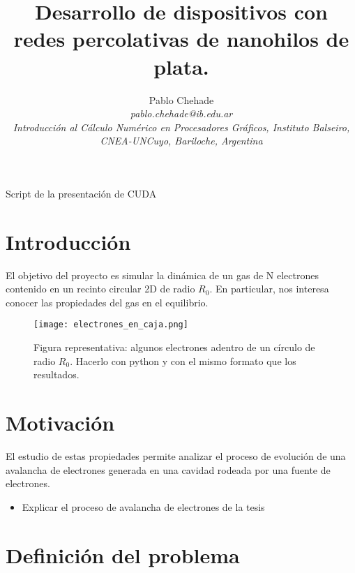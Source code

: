 \documentclass[aps,prb,twocolumn,superscriptaddress,floatfix,longbibliography]{revtex4-2}
\begin{document}
\newcommand{\mytitle}{Desarrollo de dispositivos con redes percolativas de nanohilos de plata.}

\title{\mytitle}

\author{Pablo Chehade \\
    \small \textit{pablo.chehade@ib.edu.ar} \\
    \small \textit{Introducción al Cálculo Numérico en Procesadores Gráficos, Instituto Balseiro, CNEA-UNCuyo, Bariloche, Argentina} \\}


\maketitle

Script de la presentación de CUDA


\section{Introducción}
El objetivo del proyecto es simular la dinámica de un gas de N electrones contenido en un recinto circular 2D de radio $R_0$. En particular, nos interesa conocer las propiedades del gas en el equilibrio.

\begin{figure}[h]
    \texttt{[image: electrones\_en\_caja.png]}
    \caption{Figura representativa: algunos electrones adentro de un círculo de radio $R_0$. Hacerlo con python y con el mismo formato que los resultados.}
     \label{fig:electrones_en_caja}
\end{figure}






\section{Motivación}
El estudio de estas propiedades permite analizar el proceso de evolución de una avalancha de electrones generada en una cavidad rodeada por una fuente de electrones.


\begin{itemize}
    \item Explicar el proceso de avalancha de electrones de la tesis
\end{itemize}


\section{Definición del problema}
\end{document}
